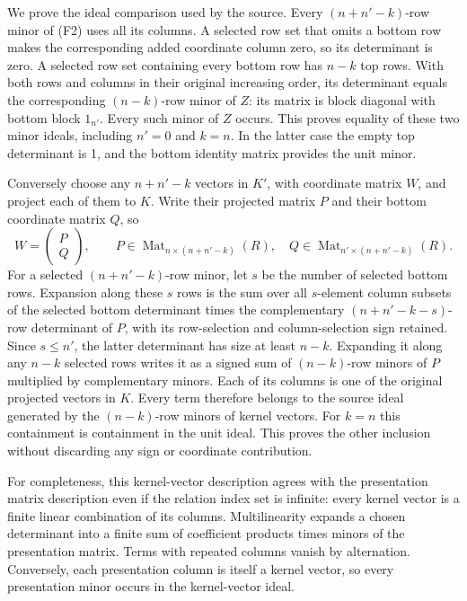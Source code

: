 We prove the ideal comparison used by the source. Every \((n+n'-k)\)-row minor of (F2) uses all its columns. A selected row set that omits a bottom row makes the corresponding added coordinate column zero, so its determinant is zero. A selected row set containing every bottom row has \(n-k\) top rows. With both rows and columns in their original increasing order, its determinant equals the corresponding \((n-k)\)-row minor of \(Z\): its matrix is block diagonal with bottom block \(1_{n'}\). Every such minor of \(Z\) occurs. This proves equality of these two minor ideals, including \(n'=0\) and \(k=n\). In the latter case the empty top determinant is 1, and the bottom identity matrix provides the unit minor.

Conversely choose any \(n+n'-k\) vectors in \(K'\), with coordinate matrix \(W\), and project each of them to \(K\). Write their projected matrix \(P\) and their bottom coordinate matrix \(Q\), so \[
 W=\begin{pmatrix}P\\Q\end{pmatrix},
 \qquad P\in\operatorname{Mat}_{n\times(n+n'-k)}(R),
 \quad Q\in\operatorname{Mat}_{n'\times(n+n'-k)}(R).
\] For a selected \((n+n'-k)\)-row minor, let \(s\) be the number of selected bottom rows. Expansion along these \(s\) rows is the sum over all \(s\)-element column subsets of the selected bottom determinant times the complementary \((n+n'-k-s)\)-row determinant of \(P\), with its row-selection and column-selection sign retained. Since \(s\leq n'\), the latter determinant has size at least \(n-k\). Expanding it along any \(n-k\) selected rows writes it as a signed sum of \((n-k)\)-row minors of \(P\) multiplied by complementary minors. Each of its columns is one of the original projected vectors in \(K\). Every term therefore belongs to the source ideal generated by the \((n-k)\)-row minors of kernel vectors. For \(k=n\) this containment is containment in the unit ideal. This proves the other inclusion without discarding any sign or coordinate contribution.

For completeness, this kernel-vector description agrees with the presentation matrix description even if the relation index set is infinite: every kernel vector is a finite linear combination of its columns. Multilinearity expands a chosen determinant into a finite sum of coefficient products times minors of the presentation matrix. Terms with repeated columns vanish by alternation. Conversely, each presentation column is itself a kernel vector, so every presentation minor occurs in the kernel-vector ideal.

